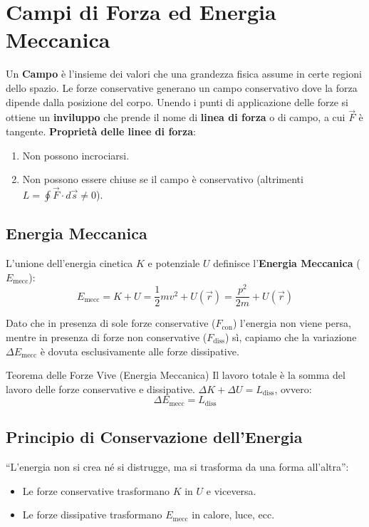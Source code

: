 \section{Campi di Forza ed Energia Meccanica}
Un \textbf{Campo} è l'insieme dei valori che una grandezza fisica assume in certe regioni dello spazio. Le forze conservative generano un campo conservativo dove la forza dipende dalla posizione del corpo.
Unendo i punti di applicazione delle forze si ottiene un \textbf{inviluppo} che prende il nome di \textbf{linea di forza} o di campo, a cui $\vec{F}$ è tangente.
\textbf{Proprietà delle linee di forza}:
\begin{enumerate}[label=\alph*)]
    \item Non possono incrociarsi.
    \item Non possono essere chiuse se il campo è conservativo (altrimenti $L = \oint \vec{F} \cdot d\vec{s} \neq 0$).
\end{enumerate}

\subsection{Energia Meccanica}
L'unione dell'energia cinetica $K$ e potenziale $U$ definisce l'\textbf{Energia Meccanica} ($E_{\text{mecc}}$):
\begin{equation}
    E_{\text{mecc}} = K + U = \frac{1}{2}mv^2 + U(\vec{r}) = \frac{p^2}{2m} + U(\vec{r})
\end{equation}

Dato che in presenza di sole forze conservative ($F_{\text{con}}$) l'energia non viene persa, mentre in presenza di forze non conservative ($F_{\text{diss}}$) sì, capiamo che la variazione $\Delta E_{\text{mecc}}$ è dovuta esclusivamente alle forze dissipative.

\begin{teorema}{Teorema delle Forze Vive (Energia Meccanica)}
Il lavoro totale è la somma del lavoro delle forze conservative e dissipative. $\Delta K + \Delta U = L_{\text{diss}}$, ovvero:
\begin{equation}
    \Delta E_{\text{mecc}} = L_{\text{diss}}
\end{equation}
\end{teorema}

\subsection{Principio di Conservazione dell'Energia}
``L'energia non si crea né si distrugge, ma si trasforma da una forma all'altra'':
\begin{itemize}
    \item Le forze conservative trasformano $K$ in $U$ e viceversa.
    \item Le forze dissipative trasformano $E_{\text{mecc}}$ in calore, luce, ecc.
\end{itemize}

